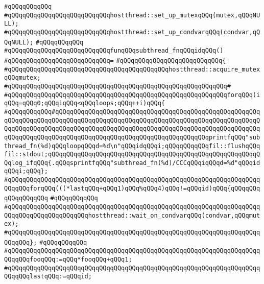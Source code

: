 \verb|#qQQqqQQqqQQq|\newline
\verb|#qQQqqQQqqQQqqQQqqQQqqQQqqQQqhostthread::set_up_mutexqQQq(mutex,qQQqNULL);|\newline
\verb|#qQQqqQQqqQQqqQQqqQQqqQQqqQQqhostthread::set_up_condvarqQQq(condvar,qQQqNULL);|\newline
\verb|#qQQqqQQqqQQq|\newline
\verb|#qQQqqQQqqQQqqQQqqQQqqQQqqQQqfunqQQqsubthread_fnqQQqidqQQq()|\newline
\verb|#qQQqqQQqqQQqqQQqqQQqqQQqqQQq=|\newline
\verb|#qQQqqQQqqQQqqQQqqQQqqQQqqQQq{|\newline
\verb|#qQQqqQQqqQQqqQQqqQQqqQQqqQQqqQQqqQQqqQQqqQQqhostthread::acquire_mutexqQQqmutex;|\newline
\verb|#qQQqqQQqqQQqqQQqqQQqqQQqqQQqqQQqqQQqqQQqqQQqqQQqqQQqqQQqqQQq#|\newline
\verb|#qQQqqQQqqQQqqQQqqQQqqQQqqQQqqQQqqQQqqQQqqQQqqQQqqQQqqQQqqQQqforqQQq(iqQQq=qQQq0;qQQqiqQQq<qQQqloops;qQQq++i)qQQq{|\newline
\verb|#qQQqqQQqqQQq#qQQqqQQqqQQqqQQqqQQqqQQqqQQqqQQqqQQqqQQqqQQqqQQqqQQqqQQqqQQqqQQqqQQqqQQqqQQqqQQqqQQqqQQqqQQqqQQqqQQqqQQqqQQqqQQqqQQqqQQqqQQqqQQqqQQqqQQqqQQqqQQqqQQqqQQqqQQqqQQqqQQqqQQqqQQqqQQqqQQqqQQqqQQqqQQqqQQqqQQqqQQqqQQqqQQqqQQqqQQqqQQqqQQqqQQqqQQqqQQqqQQqqQQqqQQqprintfqQQq"subthread_fn(%d)qQQqloopqQQqd=%d\n"qQQqidqQQqi;qQQqqQQqqQQqfil::flushqQQqfil::stdout;qQQqqQQqqQQqqQQqqQQqqQQqqQQqqQQqqQQqqQQqqQQqqQQqqQQqqQQqqQQqlog_ifqQQq{.qQQqsprintfqQQq"subthread_fn(%d)/CCCqQQqiqQQqd=%d"qQQqidqQQqi;qQQq};|\newline
\verb|#qQQqqQQqqQQqqQQqqQQqqQQqqQQqqQQqqQQqqQQqqQQqqQQqqQQqqQQqqQQqqQQqqQQqqQQqqQQqforqQQq(((*lastqQQq+qQQq1)qQQq%qQQq4)qQQq!=qQQqid)qQQq{qQQqqQQqqQQqqQQqqQQq|\newline
\verb|#qQQqqQQqqQQq|\newline
\verb|#qQQqqQQqqQQqqQQqqQQqqQQqqQQqqQQqqQQqqQQqqQQqqQQqqQQqqQQqqQQqqQQqqQQqqQQqqQQqqQQqqQQqqQQqqQQqhostthread::wait_on_condvarqQQq(condvar,qQQqmutex);|\newline
\verb|#qQQqqQQqqQQqqQQqqQQqqQQqqQQqqQQqqQQqqQQqqQQqqQQqqQQqqQQqqQQqqQQqqQQqqQQqqQQq};|\newline
\verb|#qQQqqQQqqQQq|\newline
\verb|#qQQqqQQqqQQqqQQqqQQqqQQqqQQqqQQqqQQqqQQqqQQqqQQqqQQqqQQqqQQqqQQqqQQqqQQqqQQqfooqQQq:=qQQq*fooqQQq+qQQq1;|\newline
\verb|#qQQqqQQqqQQqqQQqqQQqqQQqqQQqqQQqqQQqqQQqqQQqqQQqqQQqqQQqqQQqqQQqqQQqqQQqqQQqlastqQQq:=qQQqid;|\newline
